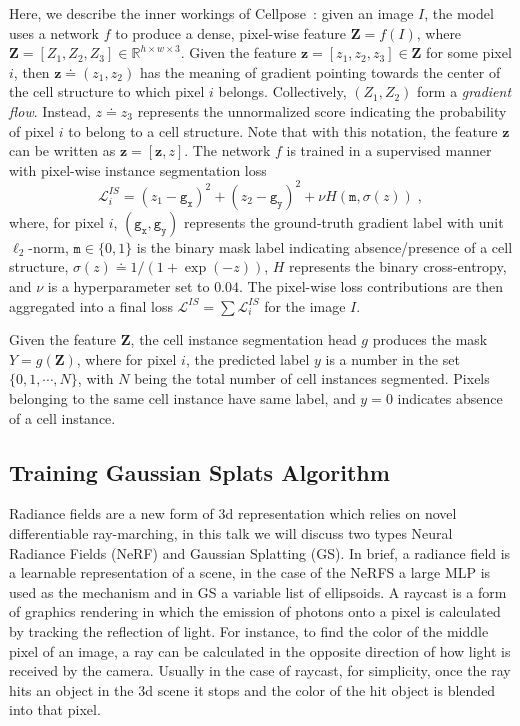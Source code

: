 Here, we describe the inner workings of Cellpose~\cite{stringer2021cellpose}: given an image $I$, the model uses a network $f$ to produce a dense, pixel-wise feature $\bm{Z} = f(I)$, where $ \bm{Z} = [Z_1, Z_2, Z_3] \in \mathbb{R}^{h \times w \times 3}$. Given the feature $\mathbf{z} = [z_1, z_2, z_3] \in \bm{Z}$ for some pixel $i$, then $\bm{z} \doteq (z_1, z_2)$ has the meaning of gradient pointing towards the center of the cell structure to which pixel $i$ belongs. Collectively, $(Z_1,Z_2)$ form a \emph{gradient flow}. Instead, $z \doteq z_3$ represents the unnormalized score indicating the probability of pixel $i$ to belong to a cell structure. Note that with this notation, the feature $\mathbf{z}$ can be written as $\mathbf{z} = [\bm{z}, z]$. The network $f$ is trained in a supervised manner with pixel-wise instance segmentation loss
\begin{equation}
  \mathcal{L}_i^{IS} = (z_1 - \mathtt{g_x})^2 + (z_2 - \mathtt{g_y})^2 + \nu H(\mathtt{m},\sigma(z))  \; ,
\end{equation}
where, for pixel $i$,  $(\mathtt{g_x}, \mathtt{g_y})$ represents the ground-truth gradient label with unit $\ell_2$-norm, $\mathtt{m} \in \{0, 1\}$ is the binary mask label indicating absence/presence of a cell structure, $\sigma(z) \doteq 1/(1+\exp(-z))$, $H$ represents the binary cross-entropy, and $\nu$ is a hyperparameter set to $0.04$. The pixel-wise loss contributions are then aggregated into a final loss $\mathcal{L}^{IS} = \sum \mathcal{L}_i^{IS}$ for the image $I$.


Given the feature $\bm{Z}$, the cell instance segmentation head $g$ produces the mask $Y = g(\bm{Z})$, where for pixel $i$, the predicted label $y$ is a number in the set $\{0, 1, \cdots, N \}$, with $N$ being the total number of cell instances segmented. Pixels belonging to the same cell instance have same label, and $y=0$ indicates absence of a cell instance.


\subsection{Training Gaussian Splats Algorithm}

Radiance fields are a new form of 3d representation which relies on novel differentiable ray-marching, in this talk we will discuss two types Neural Radiance Fields (NeRF) and Gaussian Splatting (GS).   In brief, a radiance field is a learnable representation of a scene, in the case of the NeRFS a large MLP is used as the mechanism and in GS a variable list of ellipsoids.  A raycast is a form of graphics rendering in which the emission of photons onto a pixel is calculated by tracking the reflection of light.  For instance, to find the color of the middle pixel of an image, a ray can be calculated in the opposite direction of how light is received by the camera.  Usually in the case of raycast, for simplicity, once the ray hits an object in the 3d scene it stops and the color of the hit object is blended into that pixel.  \\

